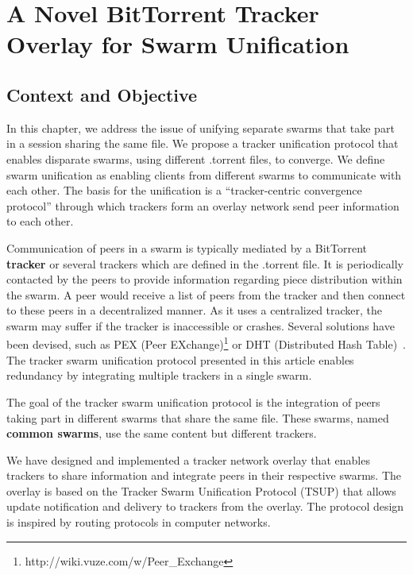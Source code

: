 
\chapter{A Novel BitTorrent Tracker Overlay for Swarm Unification}
\label{chapter:unified-tracker}




\section{Context and Objective}
\label{sec:unified-tracker:context}

In this chapter, we address the issue of unifying separate swarms that take
part in a session sharing the same file. We propose a tracker unification
protocol that enables disparate swarms, using different .torrent files, to
converge. We define swarm unification as enabling clients from different
swarms to communicate with each other. The basis for the unification is a
``tracker-centric convergence protocol'' through which trackers form an
overlay network send peer information to each other.

Communication of peers in a swarm is typically mediated by a BitTorrent
\textbf{tracker} or several trackers which are defined in the .torrent file.
It is periodically contacted by the peers to provide information regarding
piece distribution within the swarm. A peer would receive a list of peers from
the tracker and then connect to these peers in a decentralized manner. As it
uses a centralized tracker, the swarm may suffer if the tracker is
inaccessible or crashes. Several solutions have been devised, such as PEX
(Peer EXchange)\footnote{http://wiki.vuze.com/w/Peer\_Exchange} or DHT
(Distributed Hash Table)~\cite{dht-paper}. The tracker swarm unification
protocol presented in this article enables redundancy by integrating multiple
trackers in a single swarm.

The goal of the tracker swarm unification protocol is the integration of peers
taking part in different swarms that share the same file. These swarms, named
\textbf{common swarms}, use the same content but different trackers.

We have designed and implemented a tracker network overlay that enables
trackers to share information and integrate peers in their respective swarms.
The overlay is based on the Tracker Swarm Unification Protocol (TSUP) that
allows update notification and delivery to trackers from the overlay. The
protocol design is inspired by routing protocols in computer networks.


